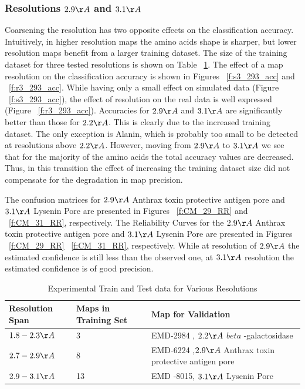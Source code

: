 \subsubsection{Resolutions $2.9 \AA$ and   $3.1 \AA$ }
Coarsening the resolution has two opposite effects on the classification accuracy.
Intuitively, in higher resolution maps the amino acids shape is sharper, but lower resolution maps benefit from a larger training dataset.
The size of the training dataset for three tested resolutions is shown on Table ~\ref{t0}.
The effect of a map resolution on the classification accuracy is shown in Figures ~\ref{f:s3_293_acc} and ~\ref{f:r3_293_acc}.
While having only a small effect on simulated data (Figure ~\ref{f:s3_293_acc}), the effect of resolution on the real data is well expressed (Figure ~\ref{f:r3_293_acc}).
 Accuracies for $2.9 \AA$ and $3.1 \AA$ are significantly better than those for $2.2 \AA$. This is clearly due to the increased training dataset. 
 The only exception is Alanin, which is probably too small to be detected at resolutions above $2.2 \AA$.
However, moving from $2.9 \AA$ to $3.1 \AA$ we see that for the majority of the amino acids the total accuracy values are decreased.  Thus, in this transition the effect of increasing the training dataset size did not compensate for the degradation in map precision.
 
The confusion matrices for $2.9 \AA$ Anthrax toxin protective antigen pore and $3.1 \AA $ Lysenin Pore are presented in Figures ~\ref{f:CM_29_RR} and ~\ref{f:CM_31_RR}, respectively. The Reliability Curves for the $2.9 \AA$ Anthrax toxin protective antigen pore and $3.1 \AA $ Lysenin Pore are presented in Figures ~\ref{f:CM_29_RR} ~\ref{f:CM_31_RR}, respectively.
 While at resolution of $2.9 \AA$ the estimated confidence is still less than the observed one, at $3.1 \AA$ resolution the estimated confidence is of good precision.
 
\begin{table}
\begin{tabular}{ | m{5em} | m{3cm} | m{3cm}| }
\hline
 Resolution Span & Maps in Training Set  & Map for Validation \\
\hline
 $1.8-2.3 \AA$  & 3  & EMD-2984 , $2.2 \AA$ $beta$ -galactosidase \cite{Banerjee20162.3Inhibition} \\
\hline
 $2.7-2.9 \AA$  & 8  & EMD-6224 ,$2.9 \AA$  Anthrax toxin protective antigen pore \cite{jiang2015atomic} \\
\hline
 $2.9-3.1 \AA$  & 13  & EMD -8015, $3.1 \AA$ Lysenin Pore \cite{Bokori-Brown2016Cryo-EMProtein} \\
\hline
 \end{tabular}
\caption{Experimental Train and Test data for Various Resolutions}\label{t0}
\end{table}


